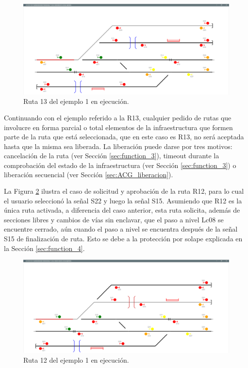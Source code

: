 	\begin{figure}[H]
		\centering
		\includegraphics[origin = c, width=1\textwidth]{resultados-obtenidos/ejemplo1/images/AGG_R13}
		\centering\caption{Ruta 13 del ejemplo 1 en ejecución.}
		\label{fig:EJ1_AGG_R13}
	\end{figure}
	
	Continuando con el ejemplo referido a la R13, cualquier pedido de rutas que involucre en forma parcial o total elementos de la infraestructura que formen parte de la ruta que está seleccionada, que en este caso es R13, no será aceptada hasta que la misma sea liberada. La liberación puede darse por tres motivos: cancelación de la ruta (ver Sección \ref{sec:function_3}), timeout durante la comprobación del estado de la infraestructura (ver Sección \ref{sec:function_3}) o liberación secuencial (ver Sección \ref{sec:ACG_liberacion}).	
	
	La Figura \ref{fig:EJ1_AGG_R12}	ilustra el caso de solicitud y aprobación de la ruta R12, para lo cual el usuario seleccionó la señal S22 y luego la señal S15. Asumiendo que R12 es la única ruta activada, a diferencia del caso anterior, esta ruta solicita, además de secciones libres y cambios de vías sin enclavar, que el paso a nivel Lc08 se encuentre cerrado, aún cuando el paso a nivel se encuentra después de la señal S15 de finalización de ruta. Esto se debe a la protección por solape explicada en la Sección \ref{sec:function_4}.

	\begin{figure}[H]
		\centering
		\includegraphics[origin = c, width=1\textwidth]{resultados-obtenidos/ejemplo1/images/AGG_R12}
		\centering\caption{Ruta 12 del ejemplo 1 en ejecución.}
		\label{fig:EJ1_AGG_R12}
	\end{figure}
	
